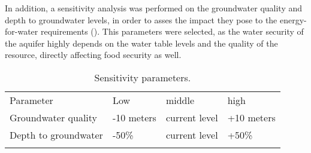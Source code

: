 In addition, a sensitivity analysis was performed on the groundwater quality and depth to groundwater levels, in order to asses the impact they pose to the energy-for-water requirements (). This parameters were selected, as the water security of the aquifer highly depends on the water table levels and the quality of the resource, directly affecting food security as well.

\begin{table}[!ht]
	\caption{\label{tbl:sensitivy}Sensitivity parameters.}
	\begin{indented}
	\item[]\begin{tabular}{@{}l l l l}
		\br
		Parameter & Low & middle & high\\
		\mr
		Groundwater quality & -10 meters & current level & +10 meters\\
		Depth to groundwater & -50\% & current level & +50\%\\
		\br
	\end{tabular}
	\end{indented}
\end{table}




